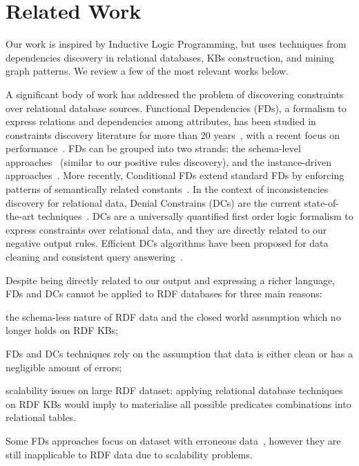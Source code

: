 \section{Related Work} \label{sec:krd_related}

Our work is inspired by Inductive Logic Programming, but uses techniques from dependencies discovery in relational databases, KBs construction, and mining graph patterns. We review a few of the most relevant works below.

 A significant body of work has addressed the problem of discovering constraints over relational database sources. Functional Dependencies (FDs), a formalism to express relations and dependencies among attributes, has been studied in constraints discovery literature for more than 20 years~\cite{abiteboul1995foundations}, with a recent focus on performance~\cite{abedjan2014dfd}. FDs can be grouped into two strands: the schema-level approaches~\cite{huhtala1999tane} (similar to our positive rules discovery), and the instance-driven approaches~\cite{wyss2001fastfds}. More recently, Conditional FDs extend standard FDs by enforcing patterns of semantically related constants~\cite{fan2011discovering}. In the context of inconsistencies discovery for relational data, Denial Constrains (DCs) are the current state-of-the-art techniques~\cite{chu2013discovering}. DCs are a universally quantified first order logic formalism to express constraints over relational data, and they are directly related to our negative output rules. Efficient DCs algorithms have been proposed for data cleaning and consistent query answering~\cite{bertossi2011database,chu2013holistic}. 

Despite being directly related to our output and expressing a richer language, FDs and DCs cannot be applied to RDF databases for three main reasons:
\begin{inparaenum}[\itshape(i)]
	\item the schema-less nature of RDF data and the closed world assumption which no longer holds on RDF KBs;
	\item FDs and DCs techniques rely on the assumption that data is either clean or has a negligible amount of errors;
	\item scalability issues on large RDF dataset: applying relational database techniques on RDF KBs would imply to materialise all possible predicates combinations into relational tables.
\end{inparaenum}
Some FDs approaches focus on dataset with erroneous data~\cite{abedjan2015temporal,kivinen1995approximate}, however they are still inapplicable to RDF data due to scalability problems.

